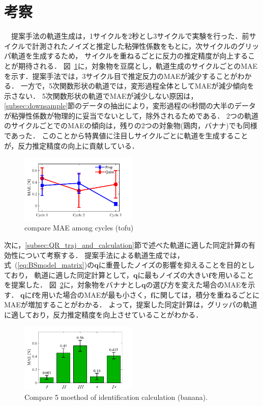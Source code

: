 \documentclass[a4paper]{jarticle}
\begin{document}
\section{考察}
　提案手法の軌道生成は，1サイクルを2秒とし3サイクルで実験を行った．前サイクルで計測されたノイズと推定した粘弾性係数をもとに，次サイクルのグリッパ軌道を生成するため，
サイクルを重ねるごとに反力の推定精度が向上することが期待される．
図~\ref{fig:compare_cycle_MAE}に，対象物を豆腐とし，軌道生成のサイクルごとのMAEを示す．提案手法では，3サイクル目で推定反力のMAEが減少することがわかる．
一方で，5次関数形状の軌道では，変形過程全体としてMAEが減少傾向を示さない．
5次関数形状の軌道でMAEが減少しない原因は，\ref{subsec:downsample}節のデータの抽出により，変形過程の6秒間の大半のデータが粘弾性係数が物理的に妥当でないとして，除外されるためである．
2つの軌道のサイクルごとでのMAEの傾向は，残りの2つの対象物(鶏肉，バナナ)でも同様であった．
このことから特異値に注目しサイクルごとに軌道を生成することが，反力推定精度の向上に貢献している．
\begin{figure}[t]
    \centering
    \includegraphics[width=0.5\textwidth]{compare_cycle_MAE.pdf}
    \caption{compare MAE among cycles (tofu)}
    \label{fig:compare_cycle_MAE}
\end{figure}

次に，\ref{subsec:QR_traj_and_calculation}節で述べた軌道に適した同定計算の有効性について考察する．
提案手法による軌道生成では，式~(\ref{eq:BSmodel_matrix})の$\mathbf{q}$に重畳したノイズの影響を抑えることを目的としており，
軌道に適した同定計算として，$\mathbf{q}$に最もノイズの大きい$\boldsymbol{f}$を用いることを提案した．
図~\ref{fig:compare_select5mode}に，対象物をバナナとし$\mathbf{q}$の選び方を変えた場合のMAEを示す．
$\mathbf{q}$に$\boldsymbol{f}$を用いた場合のMAEが最も小さく，$\boldsymbol{{f}}$に関しては，積分を重ねるごとにMAEが増加することがわかる．
よって，提案した同定計算は，グリッパの軌道に適しており，反力推定精度を向上させていることがわかる．
\begin{figure}[t]
    \centering
    \includegraphics[width=0.5\textwidth]{select_differet_q_banana.pdf}
    \captionsetup{width=0.9\linewidth} %
    \caption{Compare 5 moethod of identification calculation (banana).}
    \label{fig:compare_select5mode}
\end{figure}
\end{document}
